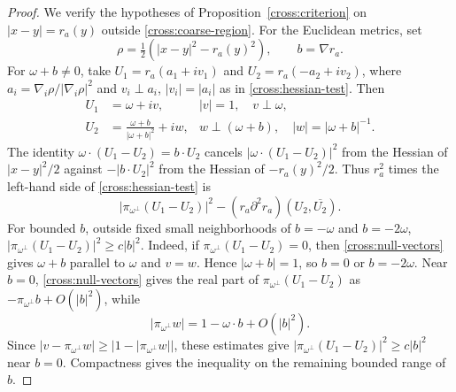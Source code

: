 \documentclass[11pt,a4paper]{article}
\theoremstyle{definition}
\theoremstyle{remark}
\numberwithin{equation}{section}
\begin{document}
\begin{proof}
We verify the hypotheses of Proposition~\ref{cross:criterion} on
$|x-y|=r_a(y)$ outside \eqref{cross:coarse-region}.
For the Euclidean metrics, set
\[
 \rho=\tfrac12(|x-y|^2-r_a(y)^2),\qquad b=\nabla r_a.
\]
For $\omega+b\ne0$, take $U_1=r_a(a_1+iv_1)$ and
$U_2=r_a(-a_2+iv_2)$, where $a_i=\nabla_i\rho/|\nabla_i\rho|^2$
and $v_i\perp a_i$, $|v_i|=|a_i|$ as in \eqref{cross:hessian-test}. Then
\begin{equation}\label{cross:null-vectors}
 \begin{aligned}
 U_1&=\omega+iv,& |v|=1,\quad v\perp\omega,\\
 U_2&=\frac{\omega+b}{|\omega+b|^2}+iw,
 &w\perp(\omega+b),\quad |w|=|\omega+b|^{-1}.
 \end{aligned}
\end{equation}
The identity $\omega\cdot(U_1-U_2)=b\cdot U_2$ cancels
$|\omega\cdot(U_1-U_2)|^2$ from the Hessian of $|x-y|^2/2$
against $-|b\cdot U_2|^2$ from the Hessian of $-r_a(y)^2/2$.
Thus $r_a^2$ times the left-hand side of \eqref{cross:hessian-test} is
\begin{equation}\label{cross:tube-test}
 \big|\pi_{\omega^\perp}(U_1-U_2)\big|^2
 -(r_a\partial^2r_a)(U_2,\overline{U_2}).
\end{equation}
For bounded $b$, outside fixed small neighborhoods of
$b=-\omega$ and $b=-2\omega$,
$|\pi_{\omega^\perp}(U_1-U_2)|^2\ge c|b|^2$.
Indeed, if $\pi_{\omega^\perp}(U_1-U_2)=0$, then
\eqref{cross:null-vectors} gives $\omega+b$ parallel to $\omega$ and
$v=w$. Hence $|\omega+b|=1$, so $b=0$ or $b=-2\omega$.
Near $b=0$, \eqref{cross:null-vectors} gives the real part of
$\pi_{\omega^\perp}(U_1-U_2)$ as
$-\pi_{\omega^\perp}b+O(|b|^2)$, while
\[
 |\pi_{\omega^\perp}w|
 =1-\omega\cdot b+O(|b|^2).
\]
Since $|v-\pi_{\omega^\perp}w|\ge \bigl|1-|\pi_{\omega^\perp}w|\bigr|$,
these estimates give $|\pi_{\omega^\perp}(U_1-U_2)|^2\ge c|b|^2$
near $b=0$. Compactness gives the inequality on the remaining
bounded range of $b$.


\end{proof}
\end{document}
